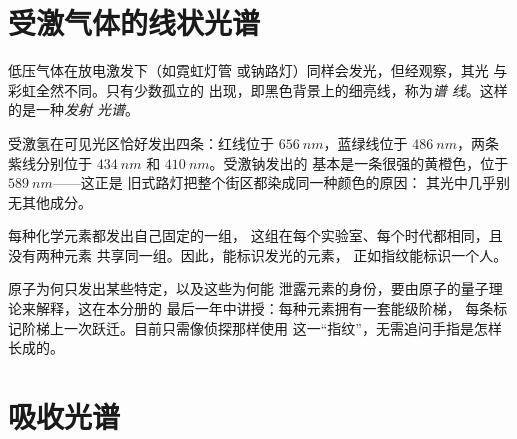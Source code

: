\section{受激气体的线状光谱}

\begin{definition}[发射光谱]\label{def:g10:light-spectra:emission}
低压气体在放电激发下（如霓虹灯管
或钠路灯）同样会发光，但经观察，其光
与彩虹全然不同。只有少数孤立的
出现，即黑色背景上的细亮线，称为\emph{谱
线}。这样的是一种\emph{发射
光谱}。
\end{definition}

\begin{example}[氢与钠]\label{ex:g10:light-spectra:hydrogen}
受激氢在可见光区恰好发出四条：红线位于
$\qty{656}{nm}$，蓝绿线位于 $\qty{486}{nm}$，两条紫线分别位于
$\qty{434}{nm}$ 和 $\qty{410}{nm}$。受激钠发出的
基本是一条很强的黄橙色，位于 $\qty{589}{nm}$——这正是
旧式路灯把整个街区都染成同一种颜色的原因：
其光中几乎别无其他成分。
\end{example}

\begin{proposition}[元素的“指纹”]\label{prop:g10:light-spectra:fingerprint}
每种化学元素都发出自己固定的一组，
这组在每个实验室、每个时代都相同，且没有两种元素
共享同一组。因此，能标识发光的元素，
正如指纹能标识一个人。
\end{proposition}
\admitted

\begin{remark}[为什么是谱线？]\label{rem:g10:light-spectra:whylines}
原子为何只发出某些特定，以及这些为何能
泄露元素的身份，要由原子的量子理论来解释，这在本分册的
最后一年中讲授：每种元素拥有一套能级阶梯，
每条标记阶梯上一次跃迁。目前只需像侦探那样使用
这一“指纹”，无需追问手指是怎样长成的。
\end{remark}

\section{吸收光谱}

